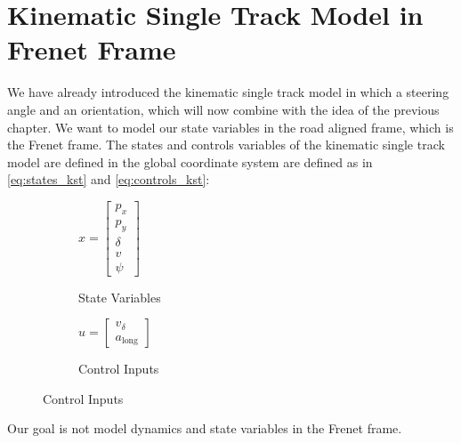 \chapter{Kinematic Single Track Model in Frenet Frame}

We have already introduced the kinematic single track model in which a steering angle and an orientation, which will now combine with the idea of the
previous chapter.
We want to model our state variables in the road aligned frame, which is the Frenet frame.
The states and controls variables of the kinematic single track model are defined in the global coordinate system are defined as in \ref{eq:states_kst} and \ref{eq:controls_kst}:

\begin{figure}[h]
	\centering
	\begin{subfigure}[b]{0.45\textwidth}
		\centering
		$x = \begin{bmatrix} p_x \\ p_y \\ \delta \\ v \\ \psi \end{bmatrix}$
		\caption{State Variables}
	\end{subfigure}
	\hfill
	\begin{subfigure}[b]{0.45\textwidth}
		\centering
		$u = \begin{bmatrix} v_{\delta} \\ a_{\text{long}} \end{bmatrix}$
		\caption{Control Inputs}
	\end{subfigure}
\end{figure}

Our goal is not model dynamics and state variables in the Frenet frame.
